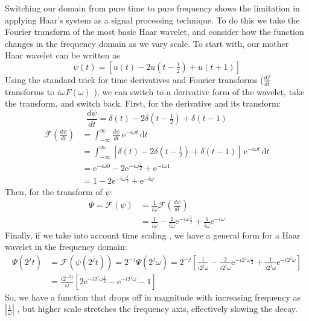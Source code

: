 \documentclass[letterpaper]{article}
\begin{document}
Switching our domain from pure time to pure frequency shows the limitation in applying Haar's system
as a signal processing technique.
To do this we take the Fourier transform of the most basic Haar wavelet,
and consider how the function changes in the frequency domain as we vary scale.
To start with, our mother Haar wavelet can be written as
\[
\psi(t) = [u(t) - 2u(t-\tfrac{1}{2}) + u(t+1)]
\]
Using the standard trick for time derivatives and Fourier transforms
(\( \frac{df}{dt} \) transforms to \( i\omega F(\omega) \) \cite[Eq.~2.21]{mallat}),
we can switch to a derivative form of the wavelet, take the transform, and switch back.
First, for the derivative and its transform:
\[
\frac{d\psi}{dt} = \delta(t) - 2\delta(t -\tfrac{1}{2}) + \delta(t - 1)
\]
\begin{align*}
\mathcal{F}(\frac{d\psi}{dt}) &= \int_{-\infty}^\infty \frac{d\psi}{dt} \, \mathrm{e}^{-i\omega t}\,\mathrm{d}t \\
    &= \int_{-\infty}^\infty 
  \left[\delta(t) - 2\delta(t -\tfrac{1}{2}) + \delta(t - 1)\right]\, \mathrm{e}^{-i\omega t}
\,\mathrm{d}t \\
    &=  \mathrm{e}^{-i \omega 0} -2 \mathrm{e}^{-i \omega \frac{1}{2}} + \mathrm{e}^{-i \omega 1} \\
    &=  1 - 2 \mathrm{e}^{-i \omega \frac{1}{2}} + \mathrm{e}^{-i \omega} 
\end{align*}
Then, for the transform of \(\psi\):
\begin{align*}
\Psi = \mathcal{F}(\psi) &= \frac{1}{i\omega} \mathcal{F}(\frac{d\psi}{dt}) \\
               &= \frac{1}{i\omega} -\frac{2}{i\omega} \mathrm{e}^{-i \omega \frac{1}{2}} + \frac{1}{i\omega} \mathrm{e}^{-i \omega}
\end{align*}
Finally, if we take into account time scaling \cite[Eq.~2.20]{mallat}, we have a general form for a Haar wavelet in the frequency domain:
\begin{align*}
\Psi(2^j t) &= \mathcal{F}(\psi(2^j t)) = 2^{-j} \Psi(2^j\omega) = 2^{-j} \left[
    \frac{1}{i 2^j \omega} -\frac{2}{i 2^j \omega} \mathrm{e}^{-i 2^j \omega \frac{1}{2}} + \frac{1}{i 2^j\omega} \mathrm{e}^{-i 2^j \omega}
\right] \\
   &= \frac{i 2^{-2j}}{\omega} \left[ 2\mathrm{e}^{-i2^j\omega\frac{1}{2}} - \mathrm{e}^{-i2^j\omega} - 1 \right]
\end{align*}
So, we have a function that drops off in magnitude with increasing frequency as \( |\tfrac{1}{\omega}| \) \cite[p.~10]{daub},
but higher scale stretches the frequency axis, effectively slowing the decay.
\end{document}
